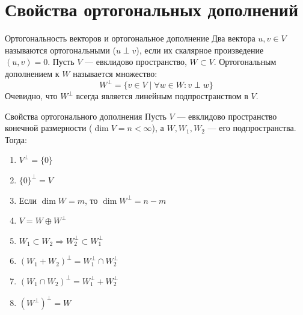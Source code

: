 \section{Свойства ортогональных дополнений}

\begin{Definition}{Ортогональность векторов и ортогональное дополнение}{}
	Два вектора $u, v \in V$ называются ортогональными ($u \perp v$), если их скалярное произведение $(u, v) = 0$.
	Пусть $V$ — евклидово пространство, $W \subset V$. Ортогональным дополнением к $W$ называется множество:
	\[
	W^\perp = \{v \in V \mid \forall w \in W: v \perp w\}
	\] 
	Очевидно, что $W^\perp$ всегда является линейным подпространством в $V$.
\end{Definition}

\begin{Statement}{Свойства ортогонального дополнения}{}
	Пусть $V$ — евклидово пространство конечной размерности ($\dim V = n < \infty$), а $W, W_1, W_2$ — его подпространства.
	Тогда:
	\begin{enumerate}
		\item $V^\perp = \{0\}$ 
		\item $\{0\}^\perp = V$ 
		\item Если $\dim W = m$, то $\dim W^\perp = n - m$ 
		\item $V = W \oplus W^\perp$ 
		\item $W_1 \subset W_2 \Rightarrow W_2^\perp \subset W_1^\perp$ 
		\item $(W_1 + W_2)^\perp = W_1^\perp \cap W_2^\perp$ 
		\item $(W_1 \cap W_2)^\perp = W_1^\perp + W_2^\perp$ 
		\item $(W^\perp)^\perp = W$ 
	\end{enumerate}
\end{Statement}


